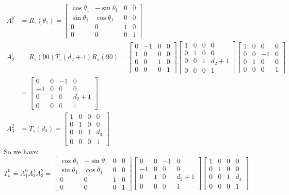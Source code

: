 \documentclass[twoside,11pt]{homework}
\begin{document}
\begin{equation}
\begin{split}
A_1^0 &= R_z(\theta_1) = \left[
\begin{matrix}
\cos \theta_1 & -\sin \theta_1 & 0 & 0 \\
\sin \theta_1  & \cos \theta_1 & 0 & 0 \\
0 & 0 & 1 & 0 \\
0 & 0 & 0 & 1
\end{matrix}
\right]
\\
A_2^1 &= R_z(90)T_z(d_2+1)R_x(90) 
=
\begin{bmatrix}
0 & -1 & 0 & 0 \\
1 & 0 & 0& 0 \\
0 & 0 & 1 &0\\
0 & 0 & 0 & 1 
\end{bmatrix}
\begin{bmatrix}
1 & 0 & 0 & 0 \\
0 & 1 & 0& 0 \\
0 & 0 & 1 &d_2+1\\
0 & 0 & 0 & 1 
\end{bmatrix}
\begin{bmatrix}
1 & 0 & 0 & 0 \\
0 & 0 & -1 & 0 \\
0 & 1 & 0 & 0 \\
0 & 0 & 0 & 1 
\end{bmatrix}
\\
&=
\begin{bmatrix}
0 & 0 & -1 & 0 \\
-1 & 0 & 0 & 0 \\
0 & 1 & 0 & d_2+1 \\
0 & 0 & 0 & 1 
\end{bmatrix}
\\
A_3^2 &= T_z(d_3) = \begin{bmatrix}
1 & 0 & 0 & 0 \\
0 & 1 & 0& 0 \\
0 & 0 & 1 &d_3\\
0 & 0 & 0 & 1 
\end{bmatrix}
\end{split}
\end{equation}
So we have:
\begin{equation}
T_n^0 = A_1^0 A_2^1 A_3^2 = \left[
\begin{matrix}
\cos \theta_1 & -\sin \theta_1 & 0 & 0 \\
\sin \theta_1  & \cos \theta_1 & 0 & 0 \\
0 & 0 & 1 & 0 \\
0 & 0 & 0 & 1
\end{matrix}
\right]
\begin{bmatrix}
0 & 0 & -1 & 0 \\
-1 & 0 & 0 & 0 \\
0 & 1 & 0 & d_2+1 \\
0 & 0 & 0 & 1 
\end{bmatrix}
\begin{bmatrix}
1 & 0 & 0 & 0 \\
0 & 1 & 0& 0 \\
0 & 0 & 1 &d_3\\
0 & 0 & 0 & 1 
\end{bmatrix}
\end{equation}
\end{document}
